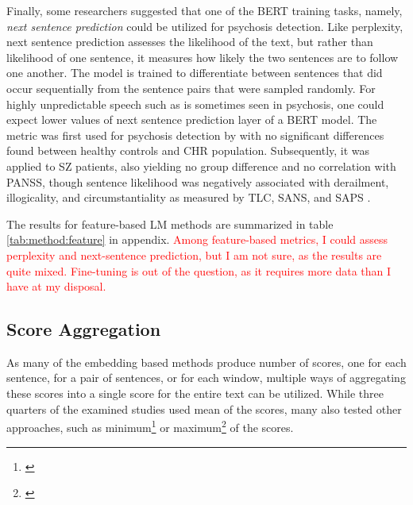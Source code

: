 Finally, some researchers suggested that one of the BERT training tasks, namely, \textit{next sentence prediction} could be utilized for psychosis detection. Like perplexity, next sentence prediction assesses the likelihood of the text, but rather than likelihood of one sentence, it measures how likely the two sentences are to follow one another. The model is trained to differentiate between sentences that did occur sequentially from the sentence pairs that were sampled randomly. For highly unpredictable speech such as is sometimes seen in psychosis, one could expect lower values of next sentence prediction layer of a BERT model. The metric was first used for psychosis detection by \citet{hitczenko2021understanding} with no significant differences found between healthy controls and CHR population. Subsequently, it was applied to SZ patients, also yielding no group difference \citep{tang2021natural} and no correlation with PANSS, though sentence likelihood was negatively associated with derailment, illogicality, and circumstantiality as measured by TLC, SANS, and SAPS \citep{jeong2023exploring}.

The results for feature-based LM methods are summarized in table \ref{tab:method:feature} in appendix. \textcolor{red}{Among feature-based metrics, I could assess perplexity and next-sentence prediction, but I am not sure, as the results are quite mixed. Fine-tuning is out of the question, as it requires more data than I have at my disposal.}

\subsection{Score Aggregation}
\label{sec:review:LM:agrregation}
As many of the embedding based methods produce number of scores, one for each sentence, for a pair of sentences, or for each window, multiple ways of aggregating these scores into a single score for the entire text can be utilized. While three quarters of the examined studies used mean of the scores, many also tested other approaches, such as minimum\footnote{\cite{bedi2015automated, iter2018automatic, corcoran2018prediction, panicheva2019semantic, haas2020linking, ryazanskaya2020thesis, xu2020centroid, morgan2021natural, sarzynska2021detecting, voppel2021quantified, bilgrami2022construct, corona2022assessing, xu2022fully, voppel2023semantic}} or maximum\footnote{\cite{corcoran2018prediction, panicheva2019semantic, haas2020linking, ryazanskaya2020thesis, morgan2021natural, bilgrami2022construct, corona2022assessing, voppel2023semantic}} of the scores. 

